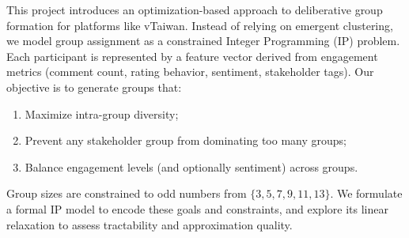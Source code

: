 This project introduces an optimization-based approach
to deliberative group formation for platforms like vTaiwan.
Instead of relying on emergent clustering,
we model group assignment as a constrained Integer Programming (IP) problem.
Each participant is represented by a feature vector derived from engagement metrics
(comment count, rating behavior, sentiment, stakeholder tags).
Our objective is to generate groups that:
\begin{enumerate}
  \item Maximize intra-group diversity;
  \item Prevent any stakeholder group from dominating too many groups;
  \item Balance engagement levels (and optionally sentiment) across groups.
\end{enumerate}
Group sizes are constrained to odd numbers from $\{3,5,7,9,11,13\}$.
We formulate a formal IP model to encode these goals and constraints,
and explore its linear relaxation to assess tractability and approximation quality.
